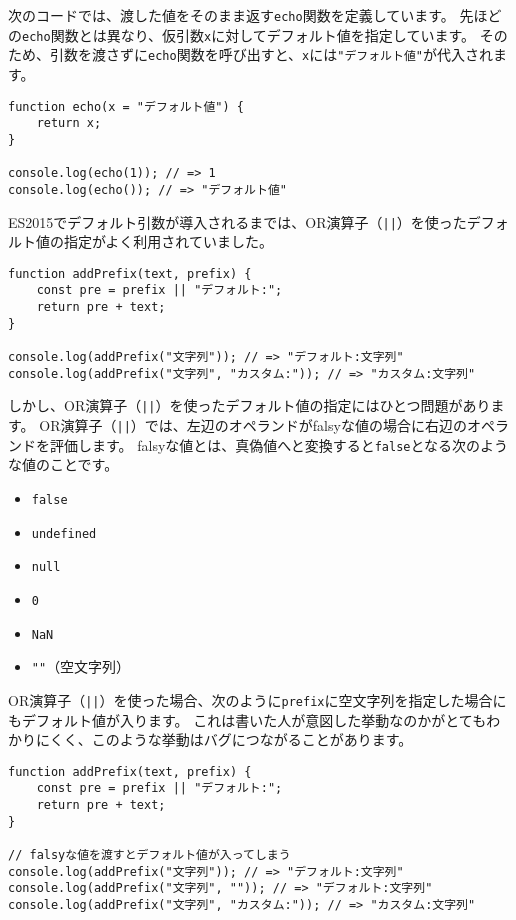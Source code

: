 次のコードでは、渡した値をそのまま返す\texttt{echo}関数を定義しています。
先ほどの\texttt{echo}関数とは異なり、仮引数\texttt{x}に対してデフォルト値を指定しています。
そのため、引数を渡さずに\texttt{echo}関数を呼び出すと、\texttt{x}には\texttt{"デフォルト値"}が代入されます。

\begin{lstlisting}
function echo(x = "デフォルト値") {
    return x;
}

console.log(echo(1)); // => 1
console.log(echo()); // => "デフォルト値"
\end{lstlisting}

ES2015でデフォルト引数が導入されるまでは、OR演算子（\texttt{||}）を使ったデフォルト値の指定がよく利用されていました。

\begin{lstlisting}
function addPrefix(text, prefix) {
    const pre = prefix || "デフォルト:";
    return pre + text;
}

console.log(addPrefix("文字列")); // => "デフォルト:文字列"
console.log(addPrefix("文字列", "カスタム:")); // => "カスタム:文字列"
\end{lstlisting}

しかし、OR演算子（\texttt{||}）を使ったデフォルト値の指定にはひとつ問題があります。
OR演算子（\texttt{||}）では、左辺のオペランドがfalsyな値の場合に右辺のオペランドを評価します。
falsyな値とは、真偽値へと変換すると\texttt{false}となる次のような値のことです。

\begin{itemize}
\item
  \texttt{false}
\item
  \texttt{undefined}
\item
  \texttt{null}
\item
  \texttt{0}
\item
  \texttt{NaN}
\item
  \texttt{""}（空文字列）
\end{itemize}

OR演算子（\texttt{||}）を使った場合、次のように\texttt{prefix}に空文字列を指定した場合にもデフォルト値が入ります。
これは書いた人が意図した挙動なのかがとてもわかりにくく、このような挙動はバグにつながることがあります。

\begin{lstlisting}
function addPrefix(text, prefix) {
    const pre = prefix || "デフォルト:";
    return pre + text;
}

// falsyな値を渡すとデフォルト値が入ってしまう
console.log(addPrefix("文字列")); // => "デフォルト:文字列"
console.log(addPrefix("文字列", "")); // => "デフォルト:文字列"
console.log(addPrefix("文字列", "カスタム:")); // => "カスタム:文字列"
\end{lstlisting}

